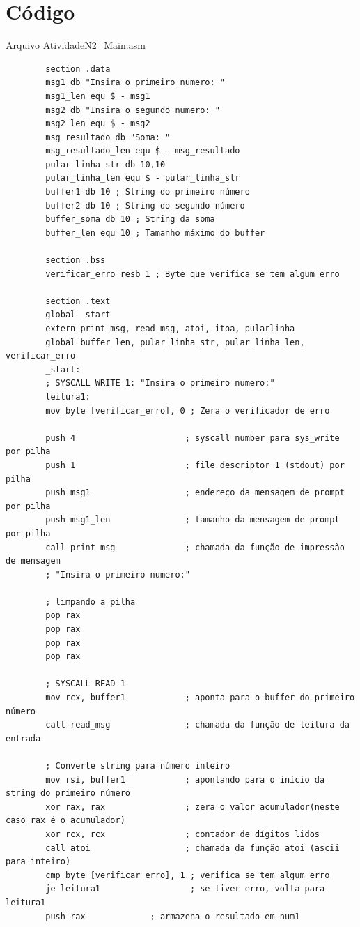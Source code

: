 \documentclass[12pt, openany, oneside, a4paper, brazil]{abntex2}
\begin{document}
	\section*{Código}
	Arquivo AtividadeN2\_Main.asm
	\begin{verbatim}
		section .data
		msg1 db "Insira o primeiro numero: "
		msg1_len equ $ - msg1
		msg2 db "Insira o segundo numero: "
		msg2_len equ $ - msg2
		msg_resultado db "Soma: "
		msg_resultado_len equ $ - msg_resultado
		pular_linha_str db 10,10
		pular_linha_len equ $ - pular_linha_str
		buffer1 db 10 ; String do primeiro número
		buffer2 db 10 ; String do segundo número
		buffer_soma db 10 ; String da soma
		buffer_len equ 10 ; Tamanho máximo do buffer
		
		section .bss
		verificar_erro resb 1 ; Byte que verifica se tem algum erro
		
		section .text
		global _start
		extern print_msg, read_msg, atoi, itoa, pularlinha
		global buffer_len, pular_linha_str, pular_linha_len, verificar_erro
		_start:
		; SYSCALL WRITE 1: "Insira o primeiro numero:"
		leitura1:
		mov byte [verificar_erro], 0 ; Zera o verificador de erro
		
		push 4                      ; syscall number para sys_write por pilha
		push 1                      ; file descriptor 1 (stdout) por pilha
		push msg1                   ; endereço da mensagem de prompt por pilha
		push msg1_len               ; tamanho da mensagem de prompt por pilha
		call print_msg              ; chamada da função de impressão de mensagem
		; "Insira o primeiro numero:"
		
		; limpando a pilha
		pop rax
		pop rax
		pop rax
		pop rax
		
		; SYSCALL READ 1
		mov rcx, buffer1            ; aponta para o buffer do primeiro número
		call read_msg               ; chamada da função de leitura da entrada
		
		; Converte string para número inteiro
		mov rsi, buffer1            ; apontando para o início da string do primeiro número
		xor rax, rax                ; zera o valor acumulador(neste caso rax é o acumulador)
		xor rcx, rcx                ; contador de dígitos lidos
		call atoi                   ; chamada da função atoi (ascii para inteiro)
		cmp byte [verificar_erro], 1 ; verifica se tem algum erro
		je leitura1                  ; se tiver erro, volta para leitura1
		push rax             ; armazena o resultado em num1
		

\end{verbatim}
\end{document}
